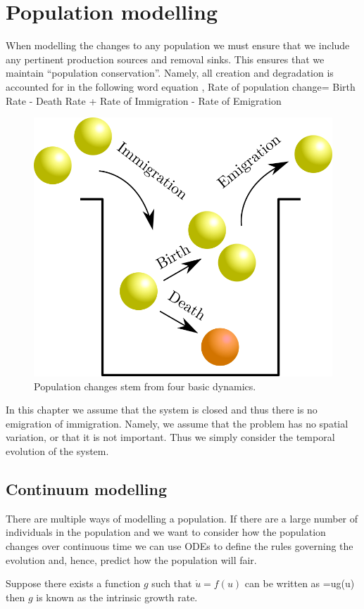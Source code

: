 \chapter{Population modelling}

When modelling the changes to any population we must ensure that we include any pertinent production sources and removal sinks. This ensures that we maintain ``population conservation''. Namely, all creation and degradation  is accounted for in the following word equation ,
\bb
\textrm{Rate of population change}= \textrm{Birth
Rate} - \textrm{Death Rate}   + \textrm{Rate of
Immigration} - \textrm{Rate of Emigration}\nonumber
\ee
\begin{figure}[!!!h!!!tb]
\centering
\includegraphics[width=\ttp]{../Pictures/Conservation.png}
\caption{\label{Conservation}Population changes stem from four basic dynamics.}
\end{figure}

In this chapter we assume that the system is closed and thus there is no emigration of immigration. Namely, we assume that the problem has no spatial variation, or that it is not important. Thus we simply consider the temporal evolution of the system.

\section{Continuum modelling}
There are multiple ways of modelling a population. If there are a large number of individuals in the population and we want to consider how the population changes over continuous time we can use ODEs to define the rules governing the evolution and, hence, predict how the population will fair.
\begin{defin}
Suppose there exists a function $g$ such that $\dot{u}=f(u)$ can be written as 
\bb
{}=ug(u)
\ee
then $g$ is known as the intrinsic growth rate.
\end{defin}

